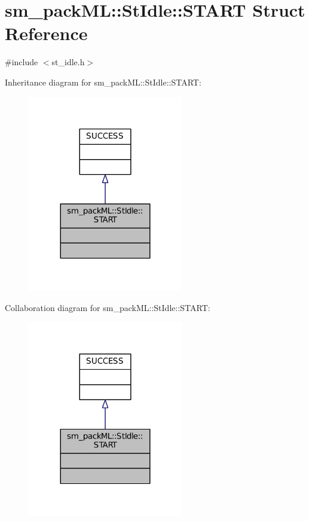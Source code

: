 \hypertarget{structsm__packML_1_1StIdle_1_1START}{}\section{sm\+\_\+pack\+ML\+:\+:St\+Idle\+:\+:S\+T\+A\+RT Struct Reference}
\label{structsm__packML_1_1StIdle_1_1START}


{\ttfamily \#include $<$st\+\_\+idle.\+h$>$}



Inheritance diagram for sm\+\_\+pack\+ML\+:\+:St\+Idle\+:\+:S\+T\+A\+RT\+:
\nopagebreak
\begin{figure}[H]
\begin{center}
\leavevmode
\includegraphics[width=192pt]{structsm__packML_1_1StIdle_1_1START__inherit__graph}
\end{center}
\end{figure}


Collaboration diagram for sm\+\_\+pack\+ML\+:\+:St\+Idle\+:\+:S\+T\+A\+RT\+:
\nopagebreak
\begin{figure}[H]
\begin{center}
\leavevmode
\includegraphics[width=192pt]{structsm__packML_1_1StIdle_1_1START__coll__graph}
\end{center}
\end{figure}


